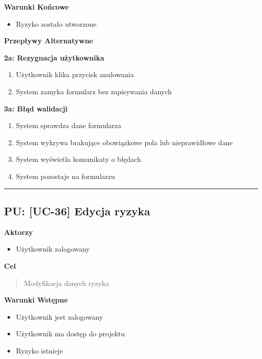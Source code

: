 \vspace{0.2cm}
\noindent\textbf{Warunki Końcowe}
\begin{itemize}
    \item Ryzyko zostało utworzone
\end{itemize}

\vspace{0.2cm}
\noindent\textbf{Przepływy Alternatywne}

\textbf{2a: Rezygnacja użytkownika}
\begin{enumerate}
    \item Użytkownik klika przycisk anulowania
    \item System zamyka formularz bez zapisywania danych
\end{enumerate}

\textbf{3a: Błąd walidacji}
\begin{enumerate}
    \item System sprawdza dane formularza
    \item System wykrywa brakujące obowiązkowe pola lub nieprawidłowe dane
    \item System wyświetla komunikaty o błędach
    \item System pozostaje na formularzu
\end{enumerate}


\hrule
\vspace{1cm}

\subsection*{PU: [UC-36] Edycja ryzyka}

\noindent\textbf{Aktorzy}
\begin{itemize}
    \item Użytkownik zalogowany
\end{itemize}

\vspace{0.2cm}
\noindent\textbf{Cel}
\begin{quote}
    Modyfikacja danych ryzyka
\end{quote}

\vspace{0.2cm}
\noindent\textbf{Warunki Wstępne}
\begin{itemize}
    \item Użytkownik jest zalogowany
    \item Użytkownik ma dostęp do projektu
    \item Ryzyko istnieje
\end{itemize}

